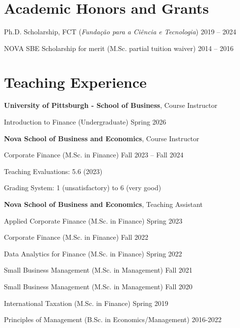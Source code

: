 \documentclass[letterpaper]{article}
\newenvironment{itemize*}{
  \begin{list}{}{
    \setlength{\leftmargin}{1.5em}
  }
}{
  \end{list}
}
\begin{document}
\section*{Academic Honors and Grants}
\vspace{-0.2in}
\hrulefill

\begin{itemize*}
\item Ph.D. Scholarship, FCT (\textit{Fundação para a Ciência e Tecnologia}) \hfill 2019 -- 2024
\item NOVA SBE Scholarship for merit (M.Sc. partial tuition waiver) \hfill 2014 -- 2016
\end{itemize*}

\section*{Teaching Experience}
\vspace{-0.2in}
\hrulefill
\begin{itemize*} 
\item \textbf{University of Pittsburgh - School of Business}, Course Instructor
\begin{itemize*}
\item Introduction to Finance (Undergraduate) \hfill Spring 2026
\end{itemize*}
\end{itemize*}
\begin{itemize*} 
\item \textbf{Nova School of Business and Economics}, Course Instructor
\begin{itemize*}
\item Corporate Finance (M.Sc. in Finance) \hfill Fall 2023 -- Fall 2024
\begin{itemize*}
\item Teaching Evaluations: 5.6 (2023) 
\item Grading System: 1 (unsatisfactory) to 6 (very good)
\end{itemize*}
\end{itemize*}
\item \textbf{Nova School of Business and Economics}, Teaching Assistant
\begin{itemize*}
\item Applied Corporate Finance (M.Sc. in Finance) \hfill Spring 2023
\item Corporate Finance (M.Sc. in Finance) \hfill Fall 2022
\item Data Analytics for Finance (M.Sc. in Finance) \hfill Spring 2022
\item Small Business Management (M.Sc. in Management)  \hfill Fall 2021
\item Small Business Management (M.Sc. in Management)  \hfill Fall 2020
\item International Taxation (M.Sc. in Finance) \hfill Spring 2019
\item Principles of Management (B.Sc. in Economics/Management) \hfill 2016-2022
\end{itemize*}
\end{itemize*}
\end{document}
